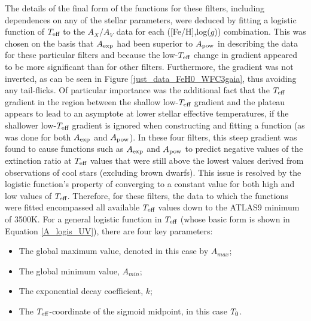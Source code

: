 \documentclass[12pt, a4paper]{report}
\begin{document}
The details of the final form of the functions for these filters, including dependences on any of the stellar parameters, were deduced by fitting a logistic function of $T_{\textnormal{eff}}$ to the $A_{X}/A_{V}$ data for each ([Fe/H],log($g$)) combination. This was chosen on the basis that $A_{\textnormal{exp}}$ had been superior to $A_{\textnormal{pow}}$ in describing the data for these particular filters and because the low-$T_{\textnormal{eff}}$ change in gradient appeared to be more significant than for other filters. Furthermore, the gradient was not inverted, as can be seen in Figure \ref{just_data_FeH0_WFC3gaia}, thus avoiding any tail-flicks. Of particular importance was the additional fact that the $T_{\textnormal{eff}}$ gradient in the region between the shallow low-$T_{\textnormal{eff}}$ gradient and the plateau appears to lead to an asymptote at lower stellar effective temperatures, if the shallower low-$T_{\textnormal{eff}}$ gradient is ignored when constructing and fitting a function (as was done for both $A_{\textnormal{exp}}$ and $A_{\textnormal{pow}}$). In these four filters, this steep gradient was found to cause functions such as $A_{\textnormal{exp}}$ and $A_{\textnormal{pow}}$ to predict negative values of the extinction ratio at $T_{\textnormal{eff}}$ values that were still above the lowest values derived from observations of cool stars (excluding brown dwarfs). This issue is resolved by the logistic function's property of converging to a constant value for both high and low values of $T_{\textnormal{eff}}$. Therefore, for these filters, the data to which the functions were fitted encompassed all available $T_{\textnormal{eff}}$ values down to the ATLAS9 minimum of 3500K. For a general logistic function in $T_{\textnormal{eff}}$ (whose basic form is shown in Equation \ref{A_logis_UV}), there are four key parameters:

\begin{itemize}
\item The global maximum value, denoted in this case by $A_{max}$;
\item The global minimum value, $A_{min}$;
\item The exponential decay coefficient, $k$;
\item The $T_{\textnormal{eff}}$-coordinate of the sigmoid midpoint, in this case $T_{\textnormal{0}}$.
\end{itemize}
\end{document}
